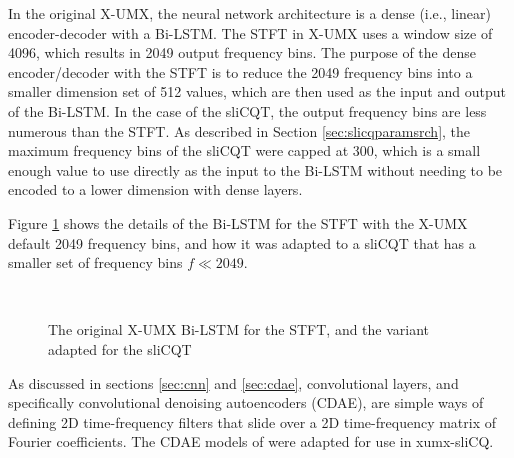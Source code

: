 \documentclass[report.tex]{subfiles}
\begin{document}
In the original X-UMX, the neural network architecture is a dense (i.e., linear) encoder-decoder with a Bi-LSTM. The STFT in X-UMX uses a window size of 4096, which results in 2049 output frequency bins. The purpose of the dense encoder/decoder with the STFT is to reduce the 2049 frequency bins into a smaller dimension set of 512 values, which are then used as the input and output of the Bi-LSTM. In the case of the sliCQT, the output frequency bins are less numerous than the STFT. As described in Section \ref{sec:slicqparamsrch}, the maximum frequency bins of the sliCQT were capped at 300, which is a small enough value to use directly as the input to the Bi-LSTM without needing to be encoded to a lower dimension with dense layers.

Figure \ref{fig:umxnetworkdetails} shows the details of the Bi-LSTM for the STFT with the X-UMX default 2049 frequency bins, and how it was adapted to a sliCQT that has a smaller set of frequency bins $f \ll 2049$.

\begin{figure}[ht]
	\centering
	\\
	\caption{The original X-UMX Bi-LSTM for the STFT, and the variant adapted for the sliCQT}
	\label{fig:umxnetworkdetails}
\end{figure}

As discussed in sections \ref{sec:cnn} and \ref{sec:cdae}, convolutional layers, and specifically convolutional denoising autoencoders (CDAE), are simple ways of defining 2D time-frequency filters that slide over a 2D time-frequency matrix of Fourier coefficients. The CDAE models of \textcite{plumbley1, plumbley2} were adapted for use in xumx-sliCQ.
\end{document}
